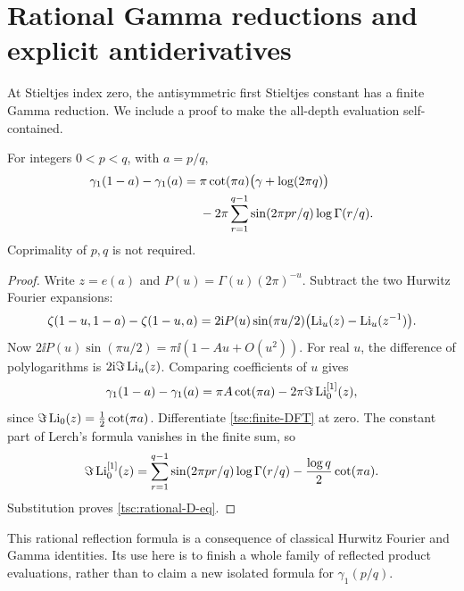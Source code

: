 \section{Rational Gamma reductions and explicit antiderivatives}\label{tsc:gamma}
At Stieltjes index zero, the antisymmetric first Stieltjes constant has a
finite Gamma reduction. We include a proof to make the all-depth evaluation
self-contained.

\begin{proposition}\label{tsc:rational-D}
For integers $0<p<q$, with $a=p/q$,
\begin{align}\label{tsc:rational-D-eq}
 \gamma_1(1-a)-\gamma_1(a)
 ={}&\pi\cot(\pi a)\bigl(\gamma+\log(2\pi q)\bigr)\notag\\
 &-2\pi\sum_{r=1}^{q-1}\sin(2\pi pr/q)\log\Gamma(r/q).
\end{align}
Coprimality of $p,q$ is not required.
\end{proposition}
\begin{proof}
Write $z=e(a)$ and
$P(u)=\Gamma(u)(2\pi)^{-u}$. Subtract the two Hurwitz Fourier expansions:
\[
 \zeta(1-u,1-a)-\zeta(1-u,a)
      =2\mathrm i P(u)\sin(\pi u/2)
                    \bigl(\operatorname{Li}_u(z)-\operatorname{Li}_u(z^{-1})\bigr).
\]
Now $2\ii P(u)\sin(\pi u/2)=\pi\ii(1-Au+O(u^2))$.
For real $u$, the difference of polylogarithms is $2\mathrm i\Im\operatorname{Li}_u(z)$.
Comparing coefficients of $u$ gives
\[
 \gamma_1(1-a)-\gamma_1(a)
       =\pi A\cot(\pi a)-2\pi\Im\operatorname{Li}_0^{[1]}(z),
\]
since $\Im\operatorname{Li}_0(z)=\tfrac12\cot(\pi a)$.
Differentiate \eqref{tsc:finite-DFT} at zero. The constant part of Lerch's
formula vanishes in the finite sum, so
\[
 \Im\operatorname{Li}_0^{[1]}(z)=
     \sum_{r=1}^{q-1}\sin(2\pi pr/q)\log\Gamma(r/q)
                -\frac{\log q}{2}\cot(\pi a).
\]
Substitution proves \eqref{tsc:rational-D-eq}.
\end{proof}
This rational reflection formula is a consequence of classical Hurwitz
Fourier and Gamma identities. Its use here is to finish a whole family of
reflected product evaluations, rather than to claim a new isolated formula
for $\gamma_1(p/q)$.

